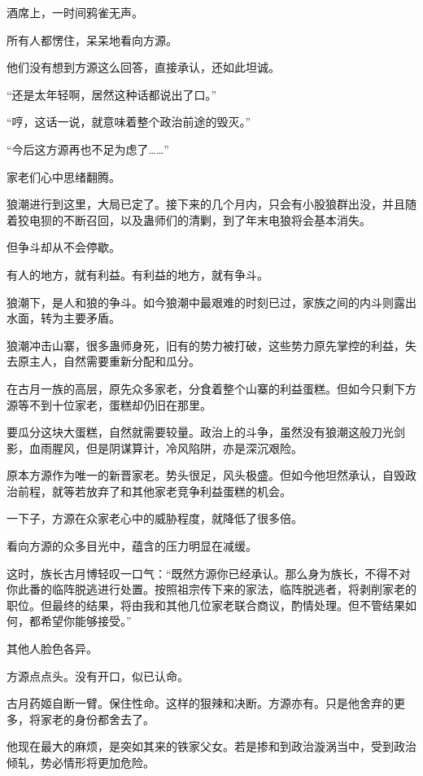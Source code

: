 
\begin{this_body}

酒席上，一时间鸦雀无声。

所有人都愣住，呆呆地看向方源。

他们没有想到方源这么回答，直接承认，还如此坦诚。

“还是太年轻啊，居然这种话都说出了口。”

“哼，这话一说，就意味着整个政治前途的毁灭。”

“今后这方源再也不足为虑了……”

家老们心中思绪翻腾。

狼潮进行到这里，大局已定了。接下来的几个月内，只会有小股狼群出没，并且随着狡电狈的不断召回，以及蛊师们的清剿，到了年末电狼将会基本消失。

但争斗却从不会停歇。

有人的地方，就有利益。有利益的地方，就有争斗。

狼潮下，是人和狼的争斗。如今狼潮中最艰难的时刻已过，家族之间的内斗则露出水面，转为主要矛盾。

狼潮冲击山寨，很多蛊师身死，旧有的势力被打破，这些势力原先掌控的利益，失去原主人，自然需要重新分配和瓜分。

在古月一族的高层，原先众多家老，分食着整个山寨的利益蛋糕。但如今只剩下方源等不到十位家老，蛋糕却仍旧在那里。

要瓜分这块大蛋糕，自然就需要较量。政治上的斗争，虽然没有狼潮这般刀光剑影，血雨腥风，但是阴谋算计，冷风陷阱，亦是深沉艰险。

原本方源作为唯一的新晋家老。势头很足，风头极盛。但如今他坦然承认，自毁政治前程，就等若放弃了和其他家老竞争利益蛋糕的机会。

一下子，方源在众家老心中的威胁程度，就降低了很多倍。

看向方源的众多目光中，蕴含的压力明显在减缓。

这时，族长古月博轻叹一口气：“既然方源你已经承认。那么身为族长，不得不对你此番的临阵脱逃进行处置。按照祖宗传下来的家法，临阵脱逃者，将剥削家老的职位。但最终的结果，将由我和其他几位家老联合商议，酌情处理。但不管结果如何，都希望你能够接受。”

其他人脸色各异。

方源点点头。没有开口，似已认命。

古月药姬自断一臂。保住性命。这样的狠辣和决断。方源亦有。只是他舍弃的更多，将家老的身份都舍去了。

他现在最大的麻烦，是突如其来的铁家父女。若是掺和到政治漩涡当中，受到政治倾轧，势必情形将更加危险。


\end{this_body}
